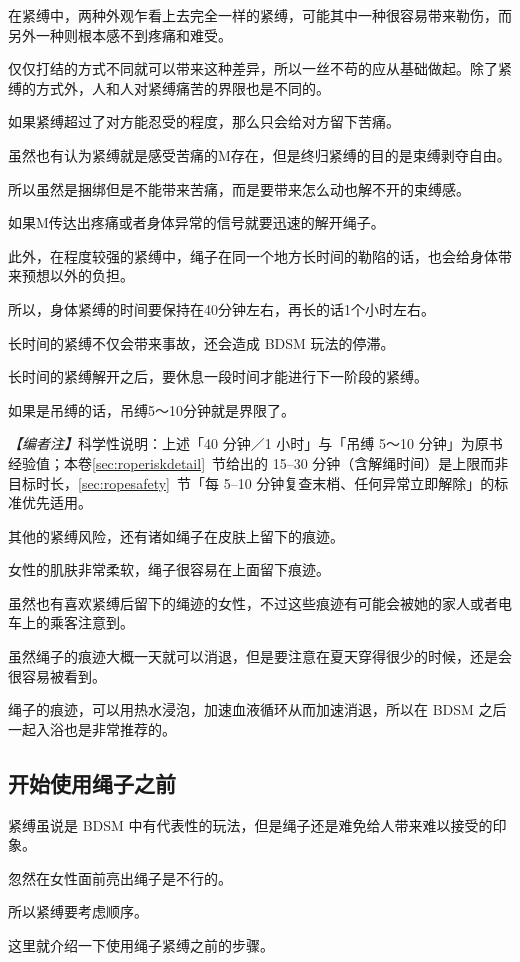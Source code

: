 \documentclass[12pt,UTF8]{ctexbook}
\begin{document}
在紧缚中，两种外观乍看上去完全一样的紧缚，可能其中一种很容易带来勒伤，而另外一种则根本感不到疼痛和难受。

仅仅打结的方式不同就可以带来这种差异，所以一丝不苟的应从基础做起。除了紧缚的方式外，人和人对紧缚痛苦的界限也是不同的。

如果紧缚超过了对方能忍受的程度，那么只会给对方留下苦痛。

虽然也有认为紧缚就是感受苦痛的M存在，但是终归紧缚的目的是束缚剥夺自由。

所以虽然是捆绑但是不能带来苦痛，而是要带来怎么动也解不开的束缚感。

如果M传达出疼痛或者身体异常的信号就要迅速的解开绳子。

此外，在程度较强的紧缚中，绳子在同一个地方长时间的勒陷的话，也会给身体带来预想以外的负担。

所以，身体紧缚的时间要保持在40分钟左右，再长的话1个小时左右。

长时间的紧缚不仅会带来事故，还会造成 BDSM 玩法的停滞。

长时间的紧缚解开之后，要休息一段时间才能进行下一阶段的紧缚。

如果是吊缚的话，吊缚5～10分钟就是界限了。

\noindent\textit{【编者注】}科学性说明：上述「40 分钟／1 小时」与「吊缚 5～10 分钟」为原书经验值；本卷\ref{sec:roperiskdetail}~节给出的 15--30 分钟（含解绳时间）是上限而非目标时长，\ref{sec:ropesafety}~节「每 5--10 分钟复查末梢、任何异常立即解除」的标准优先适用。

其他的紧缚风险，还有诸如绳子在皮肤上留下的痕迹。

女性的肌肤非常柔软，绳子很容易在上面留下痕迹。

虽然也有喜欢紧缚后留下的绳迹的女性，不过这些痕迹有可能会被她的家人或者电车上的乘客注意到。

虽然绳子的痕迹大概一天就可以消退，但是要注意在夏天穿得很少的时候，还是会很容易被看到。

绳子的痕迹，可以用热水浸泡，加速血液循环从而加速消退，所以在 BDSM 之后一起入浴也是非常推荐的。

\subsection{开始使用绳子之前}

紧缚虽说是 BDSM 中有代表性的玩法，但是绳子还是难免给人带来难以接受的印象。

忽然在女性面前亮出绳子是不行的。

所以紧缚要考虑顺序。

这里就介绍一下使用绳子紧缚之前的步骤。
\end{document}
